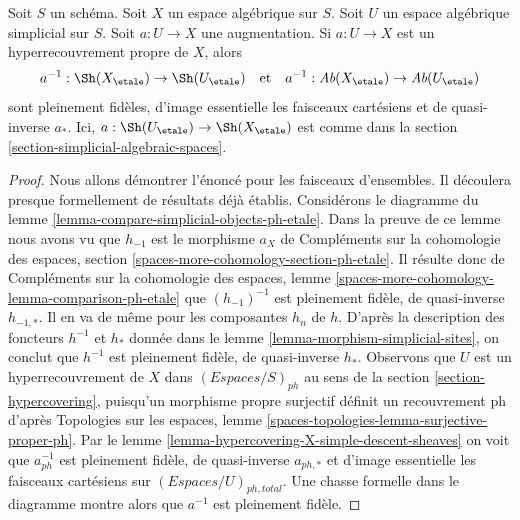 \begin{lemma}
\label{lemma-descent-sheaves-for-ph-hypercovering}
Soit $S$ un schéma. Soit $X$ un espace algébrique sur $S$.
Soit $U$ un espace algébrique simplicial sur $S$. Soit $a : U \to X$
une augmentation. Si $a : U \to X$ est un hyperrecouvrement propre de $X$,
alors
$$
a^{-1} : \Sh(X_\etale) \to \Sh(U_\etale)
\quad\text{et}\quad
a^{-1} : \textit{Ab}(X_\etale) \to \textit{Ab}(U_\etale)
$$
sont pleinement fidèles, d'image essentielle les faisceaux cartésiens et
de quasi-inverse $a_*$. Ici, $a : \Sh(U_\etale) \to \Sh(X_\etale)$
est comme dans la section \ref{section-simplicial-algebraic-spaces}.
\end{lemma}

\begin{proof}
Nous allons démontrer l'énoncé pour les faisceaux d'ensembles. Il découlera
presque formellement de résultats déjà établis.
Considérons le diagramme du lemme
\ref{lemma-compare-simplicial-objects-ph-etale}.
Dans la preuve de ce lemme nous avons vu que
$h_{-1}$ est le morphisme $a_X$ de
Compléments sur la cohomologie des espaces, section
\ref{spaces-more-cohomology-section-ph-etale}.
Il résulte donc de
Compléments sur la cohomologie des espaces, lemme
\ref{spaces-more-cohomology-lemma-comparison-ph-etale}
que $(h_{-1})^{-1}$ est pleinement fidèle, de quasi-inverse $h_{-1, *}$.
Il en va de même pour les composantes $h_n$ de $h$.
D'après la description des foncteurs $h^{-1}$ et $h_*$ donnée dans le
lemme \ref{lemma-morphism-simplicial-sites},
on conclut que $h^{-1}$ est pleinement fidèle, de quasi-inverse $h_*$.
Observons que $U$ est un hyperrecouvrement de $X$ dans $(\textit{Espaces}/S)_{ph}$
au sens de la section \ref{section-hypercovering}, puisqu'un morphisme propre
surjectif définit un recouvrement ph d'après Topologies sur les espaces, lemme
\ref{spaces-topologies-lemma-surjective-proper-ph}.
Par le lemme \ref{lemma-hypercovering-X-simple-descent-sheaves}
on voit que $a_{ph}^{-1}$ est pleinement fidèle, de quasi-inverse
$a_{ph, *}$ et d'image essentielle les faisceaux cartésiens
sur $(\textit{Espaces}/U)_{ph, total}$.
Une chasse formelle dans le diagramme montre alors que
$a^{-1}$ est pleinement fidèle.


\end{proof}
